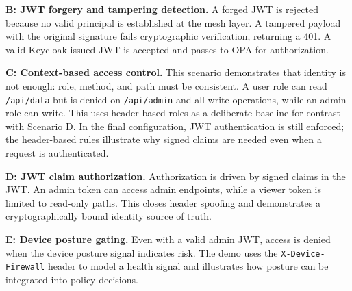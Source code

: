 \documentclass[conference]{IEEEtran}
\begin{document}
\textbf{B: JWT forgery and tampering detection.} A forged JWT is rejected because no valid
principal is established at the mesh layer. A tampered payload with the original
signature fails cryptographic verification, returning a 401. A valid Keycloak-issued
JWT is accepted and passes to OPA for authorization.

\textbf{C: Context-based access control.} This scenario demonstrates that identity is
not enough: role, method, and path must be consistent. A user role can read
\texttt{/api/data} but is denied on \texttt{/api/admin} and all write operations, while
an admin role can write. This uses header-based roles as a deliberate baseline for
contrast with Scenario D. In the final configuration, JWT authentication is still
enforced; the header-based rules illustrate why signed claims are needed even when a
request is authenticated.

\textbf{D: JWT claim authorization.} Authorization is driven by signed claims in the
JWT. An admin token can access admin endpoints, while a viewer token is limited to
read-only paths. This closes header spoofing and demonstrates a cryptographically
bound identity source of truth.

\textbf{E: Device posture gating.} Even with a valid admin JWT, access is denied when
the device posture signal indicates risk. The demo uses the \texttt{X-Device-Firewall}
header to model a health signal and illustrates how posture can be integrated into
policy decisions.
\end{document}
